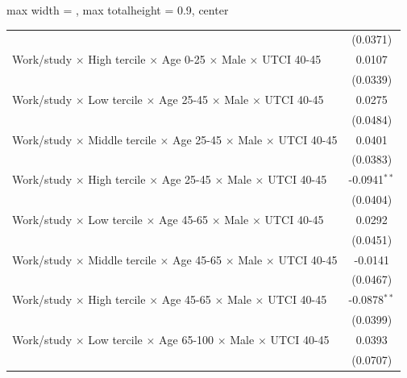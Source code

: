 \begin{table}[htbp]
\begin{adjustbox}{max width = \textwidth, max totalheight = 0.9\textheight, center}
\begin{tabular}{lc}
                                                                                                        & (0.0371)\\   
         Work/study $\times$ High tercile $\times$ Age 0-25 $\times$ Male $\times$ UTCI 40-45           & 0.0107\\   
                                                                                                        & (0.0339)\\   
         Work/study $\times$ Low tercile $\times$ Age 25-45 $\times$ Male $\times$ UTCI 40-45           & 0.0275\\   
                                                                                                        & (0.0484)\\   
         Work/study $\times$ Middle tercile $\times$ Age 25-45 $\times$ Male $\times$ UTCI 40-45        & 0.0401\\   
                                                                                                        & (0.0383)\\   
         Work/study $\times$ High tercile $\times$ Age 25-45 $\times$ Male $\times$ UTCI 40-45          & -0.0941$^{**}$\\   
                                                                                                        & (0.0404)\\   
         Work/study $\times$ Low tercile $\times$ Age 45-65 $\times$ Male $\times$ UTCI 40-45           & 0.0292\\   
                                                                                                        & (0.0451)\\   
         Work/study $\times$ Middle tercile $\times$ Age 45-65 $\times$ Male $\times$ UTCI 40-45        & -0.0141\\   
                                                                                                        & (0.0467)\\   
         Work/study $\times$ High tercile $\times$ Age 45-65 $\times$ Male $\times$ UTCI 40-45          & -0.0878$^{**}$\\   
                                                                                                        & (0.0399)\\   
         Work/study $\times$ Low tercile $\times$ Age 65-100 $\times$ Male $\times$ UTCI 40-45          & 0.0393\\   
                                                                                                        & (0.0707)\\   

\end{tabular}
\end{adjustbox}
\end{table}
